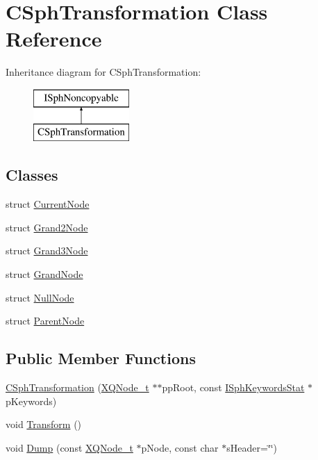\hypertarget{classCSphTransformation}{\section{C\-Sph\-Transformation Class Reference}
\label{classCSphTransformation}
}
Inheritance diagram for C\-Sph\-Transformation\-:\begin{figure}[H]
\begin{center}
\leavevmode
\includegraphics[height=2.000000cm]{classCSphTransformation}
\end{center}
\end{figure}
\subsection*{Classes}
\begin{DoxyCompactItemize}
\item 
struct \hyperlink{structCSphTransformation_1_1CurrentNode}{Current\-Node}
\item 
struct \hyperlink{structCSphTransformation_1_1Grand2Node}{Grand2\-Node}
\item 
struct \hyperlink{structCSphTransformation_1_1Grand3Node}{Grand3\-Node}
\item 
struct \hyperlink{structCSphTransformation_1_1GrandNode}{Grand\-Node}
\item 
struct \hyperlink{structCSphTransformation_1_1NullNode}{Null\-Node}
\item 
struct \hyperlink{structCSphTransformation_1_1ParentNode}{Parent\-Node}
\end{DoxyCompactItemize}
\subsection*{Public Member Functions}
\begin{DoxyCompactItemize}
\item 
\hyperlink{classCSphTransformation_ae7b815b4872b85ce40b51e64565b1be9}{C\-Sph\-Transformation} (\hyperlink{structXQNode__t}{X\-Q\-Node\-\_\-t} $\ast$$\ast$pp\-Root, const \hyperlink{structISphKeywordsStat}{I\-Sph\-Keywords\-Stat} $\ast$p\-Keywords)
\item 
void \hyperlink{classCSphTransformation_ac1003936970b7a1a7b479ee2f99f8e17}{Transform} ()
\item 
void \hyperlink{classCSphTransformation_a63475b8035e00036af9cf0f79ff2f6b1}{Dump} (const \hyperlink{structXQNode__t}{X\-Q\-Node\-\_\-t} $\ast$p\-Node, const char $\ast$s\-Header=\char`\"{}\char`\"{})
\end{DoxyCompactItemize}
